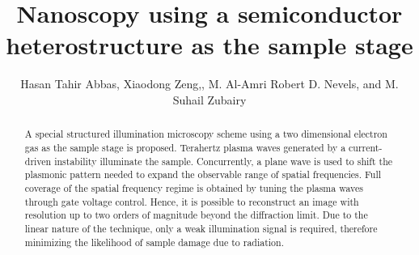 \documentclass[10pt]{article}
\renewcommand{\^}{\hat}  %
\renewcommand{\^}{\hat}  %
\begin{document}
\title{Nanoscopy using a semiconductor heterostructure as the sample stage}

\author{Hasan Tahir Abbas, Xiaodong Zeng,, M. Al-Amri Robert D. Nevels, and M. Suhail Zubairy }

\address{ Department of Electrical and Computer Engineering,
Texas A\&M University, College Station, TX 77843 USA\\
 University of Engineering \& Technology Lahore (KSK) 54890, Pakistan\\
 Institute for Quantum Science and Engineering (IQSE) and Department of Physics and Astronomy,
Texas A \& M University, College Station, Texas 77843-4242, USA\\
 The National Center for Applied Physics, KACST, P.O. Box 6068, Riyadh 11442, Saudi Arabia}




\begin{abstract}
A special structured illumination microscopy scheme using a two dimensional electron gas as the sample stage is proposed. Terahertz plasma waves generated by a current-driven instability illuminate the sample. Concurrently, a plane wave is used to shift the plasmonic pattern needed to expand the observable range of spatial frequencies. Full coverage of the spatial frequency regime is obtained by tuning the plasma waves through gate voltage control. Hence, it is possible to reconstruct an image with resolution up to two orders of magnitude beyond the diffraction limit. Due to the linear nature of the technique, only a weak illumination signal is required, therefore minimizing the likelihood of sample damage due to radiation.
\end{abstract}

\end{document}
